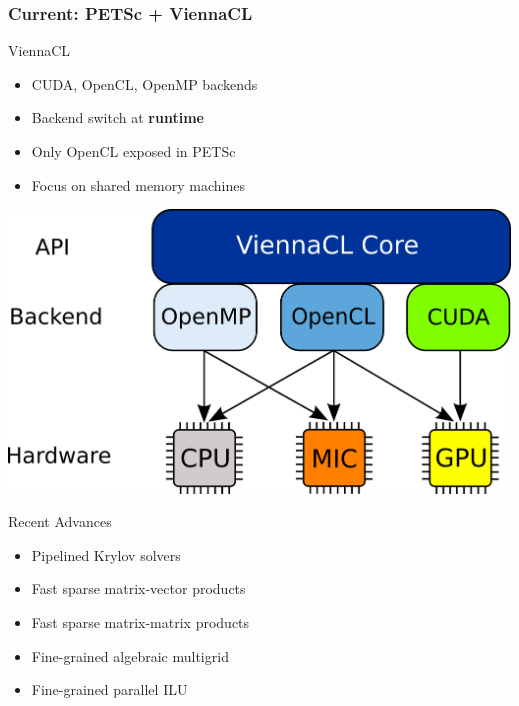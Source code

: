 \begin{frame}[fragile]
\frametitle{Current: PETSc + ViennaCL}

\begin{minipage}{0.58\textwidth}
  \begin{block}{ViennaCL}
  \begin{itemize}
   \item CUDA, OpenCL, OpenMP backends
   \item Backend switch at \textbf{runtime}
   \item Only OpenCL exposed in PETSc
   \item Focus on shared memory machines
  \end{itemize}
  \end{block}
\end{minipage}
\begin{minipage}{0.4\textwidth}
   \includegraphics[width=0.999\textwidth]{figures/ViennaCL-arch}
\end{minipage}

  \vspace*{0.3cm}
  \begin{block}{Recent Advances}
  \begin{itemize}
   \item Pipelined Krylov solvers
   \item Fast sparse matrix-vector products
   \item Fast sparse matrix-matrix products
   \item Fine-grained algebraic multigrid
   \item Fine-grained parallel ILU
  \end{itemize}
  \end{block}

\end{frame}


